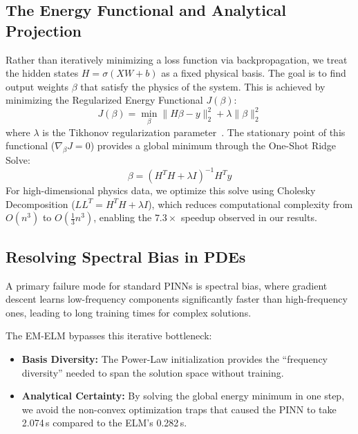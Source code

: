 \documentclass[final,12pt,3p,times,fleqn]{elsarticle}
\begin{document}
\subsection{The Energy Functional and Analytical Projection}

Rather than iteratively minimizing a loss function via backpropagation, we treat the hidden states $H = \sigma(XW + b)$ as a fixed physical basis. The goal is to find output weights $\beta$ that satisfy the physics of the system. This is achieved by minimizing the Regularized Energy Functional $J(\beta)$:
$$J(\beta) = \min_{\beta} \| H\beta - y \|^2_2 + \lambda \|\beta\|^2_2$$
where $\lambda$ is the Tikhonov regularization parameter~\cite{tikhonov1977solutions}. The stationary point of this functional ($\nabla_\beta J = 0$) provides a global minimum through the One-Shot Ridge Solve:
$$\beta = (H^T H + \lambda I)^{-1} H^T y$$
For high-dimensional physics data, we optimize this solve using Cholesky Decomposition ($L L^T = H^T H + \lambda I$), which reduces computational complexity from $O(n^3)$ to $O(\frac{1}{3} n^3)$, enabling the $7.3\times$ speedup observed in our results.

\subsection{Resolving Spectral Bias in PDEs}

A primary failure mode for standard PINNs is spectral bias, where gradient descent learns low-frequency components significantly faster than high-frequency ones, leading to long training times for complex solutions.

The EM-ELM bypasses this iterative bottleneck:
\begin{itemize}
    \item \textbf{Basis Diversity:} The Power-Law initialization provides the ``frequency diversity'' needed to span the solution space without training.
    \item \textbf{Analytical Certainty:} By solving the global energy minimum in one step, we avoid the non-convex optimization traps that caused the PINN to take 2.074\,s compared to the ELM's 0.282\,s.
\end{itemize}
\end{document}
